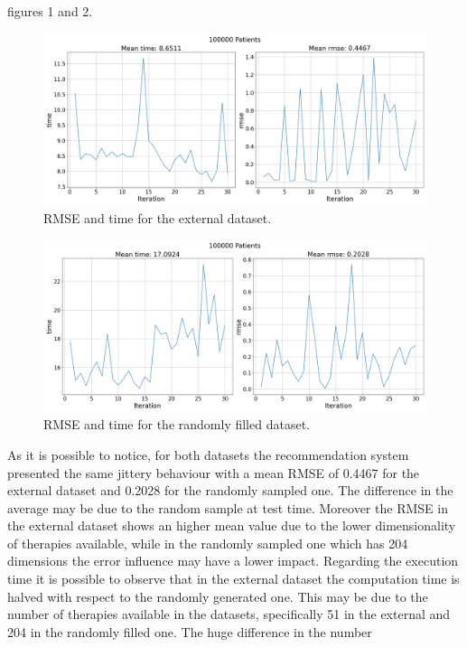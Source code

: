 figures 1 and 2.
\begin{figure}[h]
		\centering
		\includegraphics[width=\columnwidth]{../results/Stats/datasetB_100000_patients_rmse_and_time.png}
		\caption{RMSE and time for the external dataset.}
\end{figure}
\begin{figure}[h]
		\centering
		\includegraphics[width=\columnwidth]{../results/Stats/100k_patients_dataset_100000_patients_rmse_and_time.png}
		\caption{RMSE and time for the randomly filled dataset.}
\end{figure}
As it is possible to notice, for both datasets the recommendation system
presented the same jittery behaviour with a mean RMSE of 0.4467 for the
external dataset and 0.2028 for the randomly sampled one.
The difference in the average may be due to the random sample at test time.
Moreover the RMSE in the external dataset shows an higher mean value due to the
lower dimensionality of therapies available, while in the randomly
sampled one which has 204 dimensions the error influence may have a lower 
impact.
Regarding the execution time it is
possible to observe that in the external dataset the computation time
is halved with respect to the randomly generated one. This may be due to the
number of therapies available in the datasets, specifically 51 in the external
and 204 in the randomly filled one. The huge difference in the number
